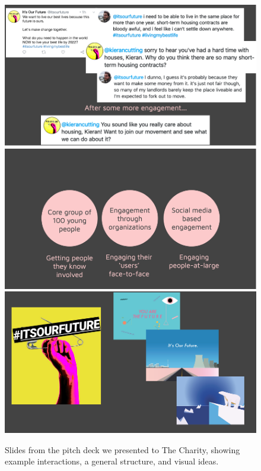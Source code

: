 \begin{figure}
    \centering
    \includegraphics{Images/7/iof-1.png}
    \includegraphics{Images/7/iof-2.png}
    \includegraphics{Images/7/iof-3.png}
    \caption{Slides from the pitch deck we presented to The Charity, showing example interactions, a general structure, and visual ideas.}
    \label{fig:iof-pitch}
\end{figure}

